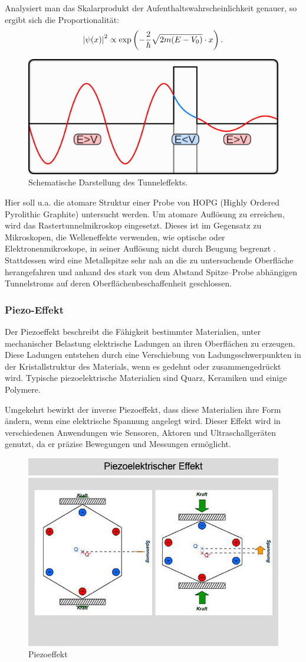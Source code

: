 \documentclass{article}
\newcommand{\defc}{black}
\newcommand{\colorT}[2][blue]{\color{#1}{#2}\color{\defc}}
\newcommand{\todo}[1]{\colorT[red]{\textbf{(#1)}}}
\begin{document}
Analysiert man das Skalarprodukt der Aufenthaltswahrscheinlichkeit genauer, so ergibt sich die Proportionalität:
\begin{align*}
    \abs{\psi(x)}^2 \propto \exp\left(-\frac{2}{\hbar} \sqrt{2m (E - V_0)} \cdot x\right).
\end{align*}

\begin{figure}[h!]
    \centering
    \includegraphics[width=0.5\linewidth]{figure/tunneleffekt.png}
    \caption{Schematische Darstellung des Tunneleffekts.}
    \label{fig:tunneleffekt}
\end{figure}

Hier soll u.a. die atomare Struktur einer Probe von HOPG (Highly Ordered Pyrolithic Graphite) untersucht werden. Um atomare Auflösung zu erreichen, wird das Rastertunnelmikroskop eingesetzt. Dieses ist im Gegensatz zu Mikroskopen, die Welleneffekte verwenden, wie optische oder Elektronenmikroskope,
in seiner Auflösung nicht durch Beugung begrenzt \todo{Quelle?}.
Stattdessen wird eine Metallspitze sehr nah an die zu untersuchende Oberfläche 
herangefahren und anhand des stark von dem Abstand Spitze--Probe abhängigen Tunnelstroms auf deren Oberflächenbeschaffenheit geschlossen.

\subsubsection*{Piezo-Effekt}
Der Piezoeffekt beschreibt die Fähigkeit bestimmter Materialien, unter mechanischer Belastung elektrische Ladungen an ihren Oberflächen zu erzeugen. Diese Ladungen entstehen durch eine Verschiebung von Ladungsschwerpunkten in der Kristallstruktur des Materials, wenn es gedehnt oder zusammengedrückt wird. Typische piezoelektrische Materialien sind Quarz, Keramiken und einige Polymere.

Umgekehrt bewirkt der inverse Piezoeffekt, dass diese Materialien ihre Form ändern, wenn eine elektrische Spannung angelegt wird. Dieser Effekt wird in verschiedenen Anwendungen wie Sensoren, Aktoren und Ultraschallgeräten genutzt, da er präzise Bewegungen und Messungen ermöglicht.

\begin{figure}[h!]
    \centering
    \includegraphics[width=0.5\linewidth]{figure/piezo_effekt.jpg}
    \caption{Piezoeffekt}
    \label{fig:piezoelektrische}
\end{figure}
\end{document}
